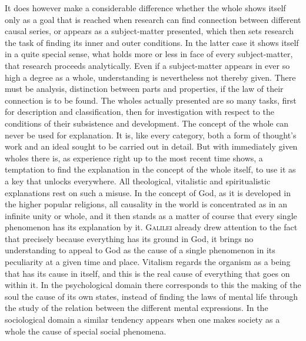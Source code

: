 \documentclass[12pt]{book}
\begin{document}
It does however make a considerable difference whether the whole shows itself only
as a goal that is reached when research can find connection between different causal
series, or appears as a subject-matter presented, which then sets research the task
of finding its inner and outer conditions. In the latter case it shows itself in a
quite special sense, what holds more or less in face of every subject-matter, that
research proceeds analytically. Even if a subject-matter appears in ever so high a
degree as a whole, understanding is nevertheless not thereby given. There must be
analysis, distinction between parts and properties, if the law of their connection is
to be found. The wholes actually presented are so many tasks, first for description
and classification, then for investigation with respect to the conditions of their
subsistence and development. The concept of the whole can never be used for
explanation. It is, like every category, both a form of thought's work and an ideal
sought to be carried out in detail. But with immediately given wholes there is, as
experience right up to the most recent time shows, a temptation to find the
explanation in the concept of the whole itself, to use it as a key that unlocks
everywhere. All theological, vitalistic and spiritualistic explanations rest on such
a misuse. In the concept of God, as it is developed in the higher popular religions,
all causality in the world is concentrated as in an infinite unity or whole, and it
then stands as a matter of course that every single phenomenon has its explanation by
it. \textsc{Galilei} already drew attention to the fact that precisely because
everything has its ground in God, it brings no understanding to appeal to God as the
cause of a single phenomenon in its peculiarity at a given time and place. Vitalism
regards the organism as a being that has its cause in itself, and this is the real
cause of everything that goes on within it. In the psychological domain there
corresponds to this the making of the soul the cause of its own states, instead of
finding the laws of mental life through the study of the relation between the
different mental expressions. In the sociological domain a similar tendency appears
when one makes society as a whole the cause of special social phenomena.
\end{document}
